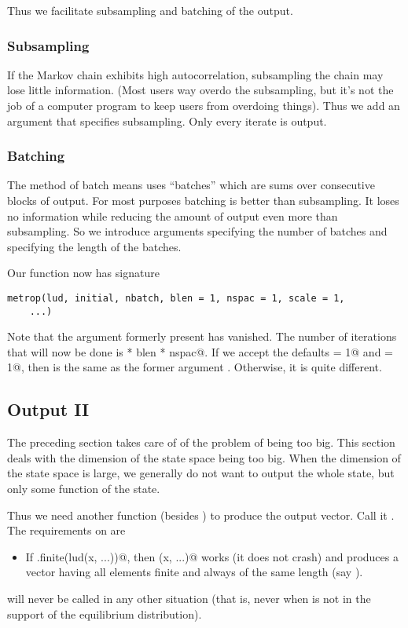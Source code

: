 \documentclass{article}
\begin{document}
Thus we facilitate subsampling and batching of the output.

\subsubsection{Subsampling}

If the Markov chain exhibits high autocorrelation, subsampling the
chain may lose little information.  (Most users way overdo the subsampling,
but it's not the job of a computer program to keep users from overdoing
things).  Thus we add an argument \verb@nspac@ that specifies subsampling.
Only every \verb@nspac@ iterate is output.

\subsubsection{Batching}

The method of batch means uses ``batches'' which are sums over consecutive
blocks of output.  For most purposes batching is better than subsampling.
It loses no information while reducing the amount of output even more
than subsampling.  So we introduce arguments \verb@nbatch@ specifying
the number of batches and \verb@blen@ specifying the length of the batches.

Our function now has signature
\begin{verbatim}
metrop(lud, initial, nbatch, blen = 1, nspac = 1, scale = 1,
    ...)
\end{verbatim}
Note that the argument \verb@niter@ formerly present has vanished.
The number of iterations that will now be done is
\verb@nbatch * blen * nspac@.  If we accept the defaults
\verb@blen = 1@ and \verb@nspac = 1@, then \verb@nbatch@ is the same
as the former argument \verb@niter@.  Otherwise, it is quite different.

\subsection{Output II}

The preceding section takes care of of the problem of \verb@niter@ being
too big.  This section deals with the dimension of the state space being
too big.  When the dimension of the state space is large, we generally
do not want to output the whole state, but only some function of the
state.

Thus we need another function (besides \verb@lud@) to produce the
output vector.  Call it \verb@outfun@.  The requirements on \verb@outfun@
are
\begin{itemize}
\item If \verb@is.finite(lud(x, ...))@, then \verb@outfun(x, ...)@
works (it does not crash) and produces a vector having all elements finite
and always of the same length (say \verb@k@).
\end{itemize}
\verb@outfun@ will never be called in any other situation
(that is, never when \verb@x@ is not in the support of the equilibrium
distribution).
\end{document}
